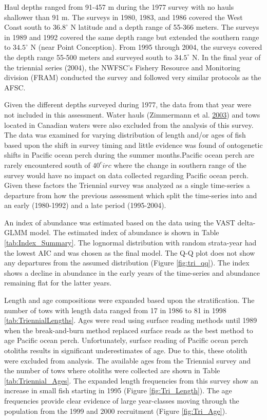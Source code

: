 \documentclass[12pt,]{article}
\begin{document}
Haul depths ranged from 91-457 m during the 1977 survey with no hauls
shallower than 91 m. The surveys in 1980, 1983, and 1986 covered the
West Coast south to \(36.8^\circ\) N latitude and a depth range of
55-366 meters. The surveys in 1989 and 1992 covered the same depth range
but extended the southern range to \(34.5^\circ\) N (near Point
Conception). From 1995 through 2004, the surveys covered the depth range
55-500 meters and surveyed south to \(34.5^\circ\) N. In the final year
of the triennial series (2004), the NWFSC's Fishery Resource and
Monitoring division (FRAM) conducted the survey and followed very
similar protocols as the AFSC.

Given the different depths surveyed during 1977, the data from that year
were not included in this assessment. Water hauls (Zimmermann et al.
\protect\hyperlink{ref-zimmermann_influence_2003}{2003}) and tows
located in Canadian waters were also excluded from the analysis of this
survey. The data was examined for varying distribution of length and/or
ages of fish based upon the shift in survey timing and little evidence
was found of ontogenetic shifts in Pacific ocean perch during the summer
months.Pacific ocean perch are rarely encountered south of \(40^circ\)
where the change in southern range of the survey would have no impact on
data collected regarding Pacific ocean perch. Given these factors the
Triennial survey was analyzed as a single time-series a departure from
how the previous assessment which split the time-series into and an
early (1980-1992) and a late period (1995-2004).

An index of abundance was estimated based on the data using the VAST
delta-GLMM model. The estimated index of abundance is shown in Table
\ref{tab:Index_Summary}. The lognormal distribution with random
strata-year had the lowest AIC and was chosen as the final model. The
Q-Q plot does not show any departures from the assumed distribution
(Figure \ref{fig:tri_qq}). The index shows a decline in abundance in the
early years of the time-series and abundance remaining flat for the
latter years.

Length and age compositions were expanded based upon the stratification.
The number of tows with length data ranged from 17 in 1986 to 81 in 1998
\ref{tab:TriennialLengths}. Ages were read using surface reading methods
until 1989 when the break-and-burn method replaced surface reads as the
best method to age Pacific ocean perch. Unfortunately, surface reading
of Pacific ocean perch otoliths results in significant underestimates of
age. Due to this, these otolith were excluded from analysis. The
available ages from the Triennial survey and the number of tows where
otoliths were collected are shown in Table \ref{tab:Triennial_Ages}. The
expanded length frequencies from this survey show an increase in small
fish starting in 1995 (Figure \ref{fig:Tri_Length}). The age frequencies
provide clear evidence of large year-classes moving through the
population from the 1999 and 2000 recruitment (Figure
\ref{fig:Tri_Age}).
\end{document}
